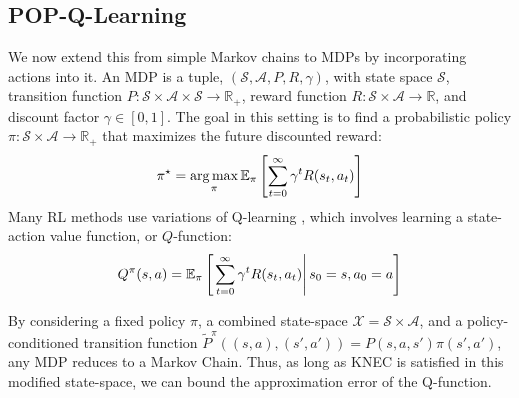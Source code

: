 \subsection{POP-Q-Learning}\label{sec:popq}

We now extend this from simple Markov chains to MDPs by incorporating actions into it. An MDP is a tuple, $(\mathcal{S}, \mathcal{A}, P, R, \gamma)$, with state space $\mathcal S$, transition function $P : \mathcal{S} \times \mathcal{A} \times \mathcal{S} \to \mathbb{R}_+$, reward function $R : \mathcal S \times \mathcal{A} \to \mathbb R$, and discount factor $\gamma \in [0, 1]$.
The goal in this setting is to find a probabilistic policy $\pi : \mathcal{S} \times \mathcal{A} \to \mathbb{R}_+$ that maximizes the future discounted reward:
\begin{equation}
  \pi^\star = \operatorname*{arg\,max}_\pi \mathbb{E}_\pi \left [ \sum_{t=0}^\infty \gamma^t R(s_t, a_t) \right ]
\end{equation}
Many RL methods use variations of Q-learning \cite{kumar2020cql,watkins1992q,mnih2013playing,haarnoja2018soft}, which involves learning a state-action value function, or $Q$-function:
\begin{equation}
  Q^\pi(s, a) = \mathbb{E}_\pi \left[\left.\sum_{t=0}^\infty \gamma^t R(s_t, a_t) \right| s_0 = s, a_0 = a \right]
\end{equation}

By considering a fixed policy $\pi$, a combined state-space $\mathcal{X} = \mathcal{S} \times \mathcal{A}$, and a policy-conditioned transition function $\tilde{P}^\pi((s, a), (s', a')) = P(s, a, s') \pi(s', a')$, any MDP reduces to a Markov Chain.
Thus, as long as KNEC is satisfied in this modified state-space, we can bound the approximation error of the Q-function.

